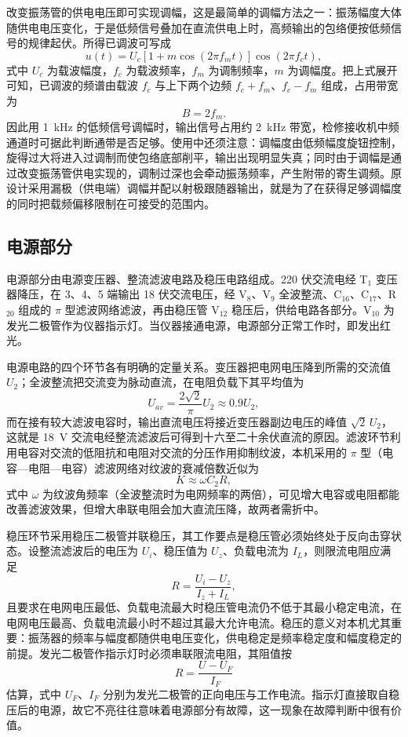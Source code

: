 \documentclass[12pt,UTF8]{ctexbook}
\begin{document}
	改变振荡管的供电电压即可实现调幅，这是最简单的调幅方法之一：振荡幅度大体随供电电压变化，于是低频信号叠加在直流供电上时，高频输出的包络便按低频信号的规律起伏。所得已调波可写成
	\[
	u(t) = U_c\left[1 + m\cos(2\pi f_m t)\right]\cos(2\pi f_c t),
	\]
	式中 $U_c$ 为载波幅度，$f_c$ 为载波频率，$f_m$ 为调制频率，$m$ 为调幅度。把上式展开可知，已调波的频谱由载波 $f_c$ 与上下两个边频 $f_c + f_m$、$f_c - f_m$ 组成，占用带宽为
	\[
	B = 2 f_m .
	\]
	因此用 1~kHz 的低频信号调幅时，输出信号占用约 2~kHz 带宽，检修接收机中频通道时可据此判断通带是否足够。使用中还须注意：调幅度由低频幅度旋钮控制，旋得过大将进入过调制而使包络底部削平，输出出现明显失真；同时由于调幅是通过改变振荡管供电实现的，调制过深也会牵动振荡频率，产生附带的寄生调频。原设计采用漏极（供电端）调幅并配以射极跟随器输出，就是为了在获得足够调幅度的同时把载频偏移限制在可接受的范围内。
	
	\subsection{电源部分}
	电源部分由电源变压器、整流滤波电路及稳压电路组成。220 伏交流电经 T\(_1\) 变压器降压，在 3、4、5 端输出 18 伏交流电压，经 V\(_8\)、V\(_9\) 全波整流、C\(_{16}\)、C\(_{17}\)、R\(_{20}\) 组成的 \(\pi\) 型滤波网络滤波，再由稳压管 V\(_{12}\) 稳压后，供给电路各部分。V\(_{10}\) 为发光二极管作为仪器指示灯。当仪器接通电源，电源部分正常工作时，即发出红光。
	
	电源电路的四个环节各有明确的定量关系。变压器把电网电压降到所需的交流值 $U_2$；全波整流把交流变为脉动直流，在电阻负载下其平均值为
	\[
	U_{av} = \frac{2\sqrt{2}}{\pi} U_2 \approx 0.9 U_2 ,
	\]
	而在接有较大滤波电容时，输出直流电压将接近变压器副边电压的峰值 $\sqrt{2}\,U_2$，这就是 18~V 交流电经整流滤波后可得到十六至二十余伏直流的原因。滤波环节利用电容对交流的低阻抗和电阻对交流的分压作用抑制纹波，本机采用的 $\pi$ 型（电容—电阻—电容）滤波网络对纹波的衰减倍数近似为
	\[
	K \approx \omega C_2 R ,
	\]
	式中 $\omega$ 为纹波角频率（全波整流时为电网频率的两倍），可见增大电容或电阻都能改善滤波效果，但增大串联电阻会加大直流压降，故两者需折中。
	
	稳压环节采用稳压二极管并联稳压，其工作要点是稳压管必须始终处于反向击穿状态。设整流滤波后的电压为 $U_i$、稳压值为 $U_z$、负载电流为 $I_L$，则限流电阻应满足
	\[
	R = \frac{U_i - U_z}{I_z + I_L},
	\]
	且要求在电网电压最低、负载电流最大时稳压管电流仍不低于其最小稳定电流，在电网电压最高、负载电流最小时不超过其最大允许电流。稳压的意义对本机尤其重要：振荡器的频率与幅度都随供电电压变化，供电稳定是频率稳定度和幅度稳定的前提。发光二极管作指示灯时必须串联限流电阻，其阻值按
	\[
	R = \frac{U - U_F}{I_F}
	\]
	估算，式中 $U_F$、$I_F$ 分别为发光二极管的正向电压与工作电流。指示灯直接取自稳压后的电源，故它不亮往往意味着电源部分有故障，这一现象在故障判断中很有价值。
	
\end{document}
